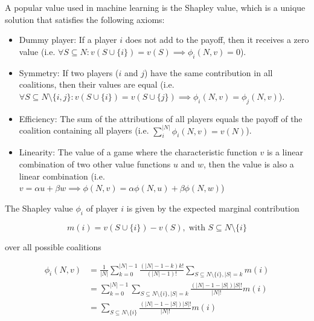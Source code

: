 A popular value used in machine learning is the Shapley value, which is a unique 
solution that satisfies the following axioms:\cite{merrick2020explanation, shapley1953value}

\begin{itemize}

    \item Dummy player: If a player $i$ does not add to the payoff, then it receives a 
        zero value (i.e. $\forall S \subseteq N: v(S \cup \{i\}) = v(S) \implies \phi_i(N, v) = 0$).

    \item Symmetry: If two players ($i$ and $j$) have the same contribution in all coalitions, then 
        their values are equal (i.e. $\forall S \subseteq N \setminus \{i, j\}: v(S \cup \{i\}) = v(S \cup \{j\}) \implies \phi_i(N, v) = \phi_j(N, v)$).

    \item Efficiency: The sum of the attributions of all players equals the payoff of the coalition containing 
        all players (i.e. $\sum^{|N|}_i \phi_i(N, v) = v(N)$).

    \item Linearity: The value of a game where the characteristic function $v$ is a linear combination of 
        two other value functions $u$ and $w$, then the value is also a linear combination (i.e. 
        $v = \alpha u + \beta w \implies \phi(N, v) = \alpha \phi(N, u) + \beta \phi(N, w)$)

\end{itemize}

The Shapley value $\phi_i$ of player $i$ is given by the expected marginal contribution\cite{zhang2022gstarx}

\begin{equation}
	m(i) = v\left(S \cup \{i\}\right) - v\left(S\right), \; \text{with } S \subseteq N \setminus \{i\}
\end{equation}

over all possible coalitions

\begin{equation}
\begin{aligned}
	\label{eq:Shapley}
    \phi_i(N, v)  &= \frac{1}{|N|} \sum_{k=0}^{|N|-1} \frac{\left(|N| - 1 - k\right)k!}{\left(|N| - 1\right)!} \sum_{S \subseteq N \setminus \{i\}, |S| = k} m(i) \\
            &= \sum_{k=0}^{|N| - 1} \sum_{S \subseteq N \setminus \{i\}, |S| = k} \frac{\left(|N| - 1 - |S|\right)|S|!}{|N|!} m(i) \\
            &= \sum_{S \subseteq N \setminus \{i\}} \frac{\left(|N| - 1 - |S|\right)|S|!}{|N|!} m(i)
\end{aligned}
\end{equation}

